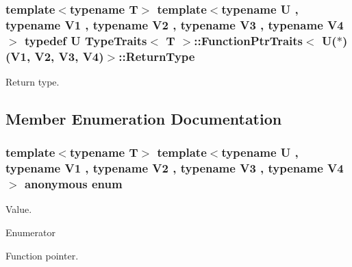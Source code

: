 \subsubsection[{\texorpdfstring{Return\+Type}{ReturnType}}]{\setlength{\rightskip}{0pt plus 5cm}template$<$typename T$>$ template$<$typename U , typename V1 , typename V2 , typename V3 , typename V4 $>$ typedef U {\bf Type\+Traits}$<$ T $>$\+::{\bf Function\+Ptr\+Traits}$<$ U($\ast$)(V1, V2, V3, V4)$>$\+::{\bf Return\+Type}}\hypertarget{structTypeTraits_1_1FunctionPtrTraits_3_01U_07_5_08_07V1_00_01V2_00_01V3_00_01V4_08_4_a5404966cd8a68a746c21e0934ec668fb}{}\label{structTypeTraits_1_1FunctionPtrTraits_3_01U_07_5_08_07V1_00_01V2_00_01V3_00_01V4_08_4_a5404966cd8a68a746c21e0934ec668fb}
Return type. 

\subsection{Member Enumeration Documentation}
\subsubsection[{\texorpdfstring{anonymous enum}{anonymous enum}}]{\setlength{\rightskip}{0pt plus 5cm}template$<$typename T$>$ template$<$typename U , typename V1 , typename V2 , typename V3 , typename V4 $>$ anonymous enum}\hypertarget{structTypeTraits_1_1FunctionPtrTraits_3_01U_07_5_08_07V1_00_01V2_00_01V3_00_01V4_08_4_a514c784eb72b113be94d1584fcb53873}{}\label{structTypeTraits_1_1FunctionPtrTraits_3_01U_07_5_08_07V1_00_01V2_00_01V3_00_01V4_08_4_a514c784eb72b113be94d1584fcb53873}
Value. \begin{Desc}
\item[Enumerator]\par
\begin{description}
\item[{\em 
Is\+Function\+Pointer\hypertarget{structTypeTraits_1_1FunctionPtrTraits_3_01U_07_5_08_07V1_00_01V2_00_01V3_00_01V4_08_4_a514c784eb72b113be94d1584fcb53873a1ec8290a45f25f538aa02b6af5ad3f3a}{}\label{structTypeTraits_1_1FunctionPtrTraits_3_01U_07_5_08_07V1_00_01V2_00_01V3_00_01V4_08_4_a514c784eb72b113be94d1584fcb53873a1ec8290a45f25f538aa02b6af5ad3f3a}
}]Function pointer. \end{description}
\end{Desc}

